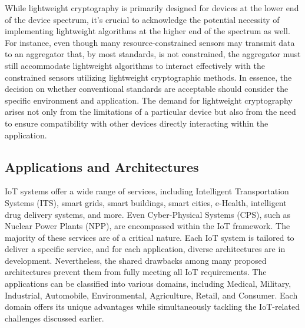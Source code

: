 \documentclass[conference,compsoc]{IEEEtran}
\begin{document}
While lightweight cryptography is primarily designed for devices at the lower end of the device spectrum, it's crucial to acknowledge the potential necessity of implementing lightweight algorithms at the higher end of the spectrum as well. For instance, even though many resource-constrained sensors may transmit data to an aggregator that, by most standards, is not constrained, the aggregator must still accommodate lightweight algorithms to interact effectively with the constrained sensors utilizing lightweight cryptographic methods. In essence, the decision on whether conventional standards are acceptable should consider the specific environment and application. The demand for lightweight cryptography arises not only from the limitations of a particular device but also from the need to ensure compatibility with other devices directly interacting within the application.
\subsection{Applications and Architectures}
IoT systems offer a wide range of services, including Intelligent Transportation Systems (ITS), smart grids, smart buildings, smart cities, e-Health, intelligent drug delivery systems, and more. Even Cyber-Physical Systems (CPS), such as Nuclear Power Plants (NPP), are encompassed within the IoT framework. The majority of these services are of a critical nature. Each IoT system is tailored to deliver a specific service, and for each application, diverse architectures are in development. 
Nevertheless, the shared drawbacks among many proposed architectures prevent them from fully meeting all IoT requirements. The applications can be classified into various domains, including Medical, Military, Industrial, Automobile, Environmental, Agriculture, Retail, and Consumer. Each domain offers its unique advantages while simultaneously tackling the IoT-related challenges discussed earlier.
\end{document}
